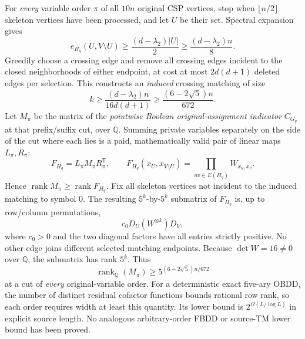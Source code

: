 \documentclass[11pt]{article}
\begin{document}
For \emph{every} variable order $\pi$ of all $10n$
original CSP vertices, stop when $\lfloor n/2\rfloor$
skeleton vertices have been processed, and let $U$
be their set. Spectral expansion gives
\[
 e_{H_q}(U,V\setminus U)
 \ge\frac{(d-\lambda_2)|U|}{2}
 \ge\frac{(d-\lambda_2)n}{8}.
\]
Greedily choose a crossing edge and remove all
crossing edges incident to the closed neighborhoods
of either endpoint, at cost at most $2d(d+1)$
deleted edges per selection. This constructs an
\emph{induced} crossing matching of size
\[
 k\ge\frac{(d-\lambda_2)n}{16d(d+1)}
 \ge\frac{(6-2\sqrt5)n}{672}.
\]
Let $M_\pi$ be the matrix of the \emph{pointwise
Boolean original-assignment indicator}
$C_{G_q}$ at that prefix/suffix cut, over $\mathbb Q$.
Summing private variables separately on the side
of the cut where each lies is a paid,
mathematically valid pair of linear maps
$L_\pi,R_\pi$:
\[
 F_{H_q}=L_\pi M_\pi R_\pi^\mathsf T,\qquad
 F_{H_q}(x_U,x_{V\setminus U})
 =\prod_{uv\in E(H_q)}W_{x_u,x_v}.
\]
Hence $\operatorname{rank}M_\pi\ge\operatorname{rank}F_{H_q}$.
Fix all skeleton vertices not incident to the
induced matching to symbol $0$. The resulting
$5^k$-by-$5^k$ submatrix of $F_{H_q}$ is, up to
row/column permutations,
\[
 c_0D_U(W^{\otimes k})D_V,
\]
where $c_0>0$ and the two diagonal factors
have all entries strictly positive. No other
edge joins different selected matching endpoints.
Because $\det W=16\ne0$ over $\mathbb Q$,
the submatrix has rank $5^k$. Thus
\[
 \boxed{\operatorname{rank}_{\mathbb Q}(M_\pi)
 \ge5^{(6-2\sqrt5)n/672}}
\]
at a cut of \emph{every} original-variable order.
For a deterministic exact five-ary OBDD, the number
of distinct residual cofactor functions bounds
rational row rank, so each order requires width
at least this quantity. Its lower bound is
$2^{\Omega(L/\log L)}$ in explicit source length.
No analogous arbitrary-order FBDD or source-TM
lower bound has been proved.
\end{document}
